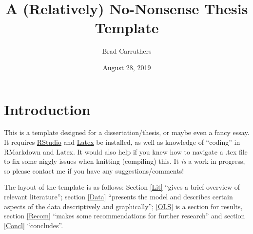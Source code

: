 \documentclass[12pt,preprint, authoryear]{article}
\title{A (Relatively) No-Nonsense Thesis Template}
\author{Brad Carruthers}
\date{August 28, 2019}
\numberwithin{equation}{section}
\numberwithin{figure}{section}
\numberwithin{table}{section}
\begin{document}
\pagestyle{fancy}
\chead{}
\rhead{}
\lfoot{}
\rfoot{} 
\lhead{}
\cfoot{\footnotesize \thepage\\}







\maketitle
\thispagestyle{empty}




\clearpage

\setcounter{page}{1}

\renewcommand{\contentsname}{Contents}
\hypersetup{linkcolor=black}
\tableofcontents
\newpage
\hypersetup{linkcolor=black}
\listoftables
\newpage
\hypersetup{linkcolor=black}
\listoffigures
\hypersetup{linkcolor=black}
\newpage


\renewcommand{\vec}[1]{\mathbf{#1}}



\section{\texorpdfstring{Introduction
\label{Intro}}{Introduction }}\label{introduction}

This is a template designed for a dissertation/thesis, or maybe even a
fancy essay. It requires
\href{https://www.rstudio.com/products/rstudio/download/}{RStudio} and
\href{https://www.latex-project.org/get/}{Latex} be installed, as well
as knowledge of ``coding'' in RMarkdown and Latex. It would also help if
you knew how to navigate a .tex file to fix some niggly issues when
knitting (compiling) this. It \emph{is} a work in progress, so please
contact me if you have any suggestions/comments!

The layout of the template is as follows: Section \ref{Lit} ``gives a
brief overview of relevant literature''; section \ref{Data} ``presents
the model and describes certain aspects of the data descriptively and
graphically''; \ref{OLS} is a section for results, section \ref{Recom}
``makes some recommendations for further research'' and section
\ref{Concl} ``concludes''.
\end{document}
